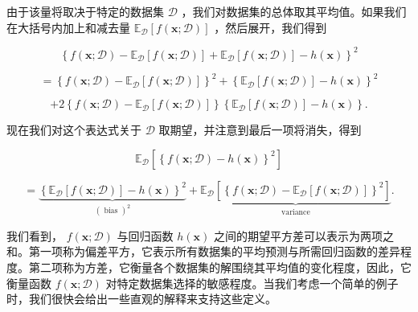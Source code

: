 \documentclass[10pt]{article}
\begin{document}
由于该量将取决于特定的数据集 \(\mathcal{D}\) ，我们对数据集的总体取其平均值。如果我们在大括号内加上和减去量 \({\mathbb{E}}_{\mathcal{D}}\left\lbrack  {f\left( {\mathbf{x};\mathcal{D}}\right) }\right\rbrack\) ，然后展开，我们得到

\[
{\left\{  f\left( \mathbf{x};\mathcal{D}\right)  - {\mathbb{E}}_{\mathcal{D}}\left\lbrack  f\left( \mathbf{x};\mathcal{D}\right) \right\rbrack   + {\mathbb{E}}_{\mathcal{D}}\left\lbrack  f\left( \mathbf{x};\mathcal{D}\right) \right\rbrack   - h\left( \mathbf{x}\right) \right\}  }^{2}
\]

\[
= {\left\{  f\left( \mathbf{x};\mathcal{D}\right)  - {\mathbb{E}}_{\mathcal{D}}\left\lbrack  f\left( \mathbf{x};\mathcal{D}\right) \right\rbrack  \right\}  }^{2} + {\left\{  {\mathbb{E}}_{\mathcal{D}}\left\lbrack  f\left( \mathbf{x};\mathcal{D}\right) \right\rbrack   - h\left( \mathbf{x}\right) \right\}  }^{2}
\]

\[
+ 2\left\{  {f\left( {\mathbf{x};\mathcal{D}}\right)  - {\mathbb{E}}_{\mathcal{D}}\left\lbrack  {f\left( {\mathbf{x};\mathcal{D}}\right) }\right\rbrack  }\right\}  \left\{  {{\mathbb{E}}_{\mathcal{D}}\left\lbrack  {f\left( {\mathbf{x};\mathcal{D}}\right) }\right\rbrack   - h\left( \mathbf{x}\right) }\right\}  . \tag{4.44}
\]

现在我们对这个表达式关于 \(\mathcal{D}\) 取期望，并注意到最后一项将消失，得到

\[
{\mathbb{E}}_{\mathcal{D}}\left\lbrack  {\left\{  f\left( \mathbf{x};\mathcal{D}\right)  - h\left( \mathbf{x}\right) \right\}  }^{2}\right\rbrack
\]

\[
= \underset{{\left( \text{ bias }\right) }^{2}}{\underbrace{{\left\{  {\mathbb{E}}_{\mathcal{D}}\left\lbrack  f\left( \mathbf{x};\mathcal{D}\right) \right\rbrack   - h\left( \mathbf{x}\right) \right\}  }^{2}}} + \underset{\text{ variance }}{\underbrace{{\mathbb{E}}_{\mathcal{D}}\left\lbrack  {\left\{  f\left( \mathbf{x};\mathcal{D}\right)  - {\mathbb{E}}_{\mathcal{D}}\left\lbrack  f\left( \mathbf{x};\mathcal{D}\right) \right\rbrack  \right\}  }^{2}\right\rbrack  }}. \tag{4.45}
\]

我们看到， \(f\left( {\mathbf{x};\mathcal{D}}\right)\) 与回归函数 \(h\left( \mathbf{x}\right)\) 之间的期望平方差可以表示为两项之和。第一项称为偏差平方，它表示所有数据集的平均预测与所需回归函数的差异程度。第二项称为方差，它衡量各个数据集的解围绕其平均值的变化程度，因此，它衡量函数 \(f\left( {\mathbf{x};\mathcal{D}}\right)\) 对特定数据集选择的敏感程度。当我们考虑一个简单的例子时，我们很快会给出一些直观的解释来支持这些定义。
\end{document}
